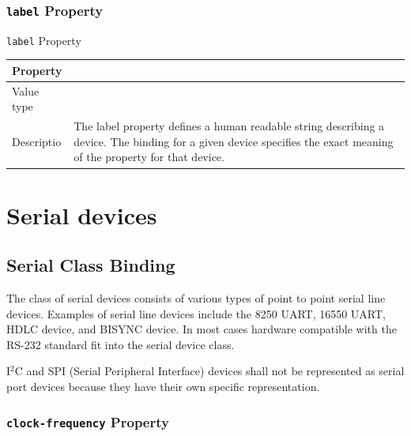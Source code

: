 \documentclass[a4paper,10pt,oneside]{sphinxmanual}
\begin{document}
\subsubsection{\texttt{label} Property}
\label{device-bindings:label-property}

\begin{threeparttable}
\capstart\caption{\texttt{label} Property}\label{device-bindings:id5}
\begin{tabulary}{\linewidth}{| l J |}
\hline
\textsf{\relax 
Property
} & \textsf{\relax 
{}
}\\
\hline
Value type
 & 
\\
\hline
Descriptio
 & 
The label property defines a human readable string describing
a device. The binding for a given device specifies the exact
meaning of the property for that device.
\\
\hline\end{tabulary}

\end{threeparttable}



\section{Serial devices}
\label{device-bindings:serial-devices}

\subsection{Serial Class Binding}
\label{device-bindings:serial-class-binding}
The class of serial devices consists of various types of point to point
serial line devices. Examples of serial line devices include the 8250
UART, 16550 UART, HDLC device, and BISYNC device. In most cases hardware
compatible with the RS-232 standard fit into the serial device class.

I$^{\text{2}}$C and SPI (Serial Peripheral Interface) devices shall not
be represented as serial port devices because they have their own
specific representation.


\subsubsection{\texttt{clock-frequency} Property}
\label{device-bindings:id1}
\end{document}
